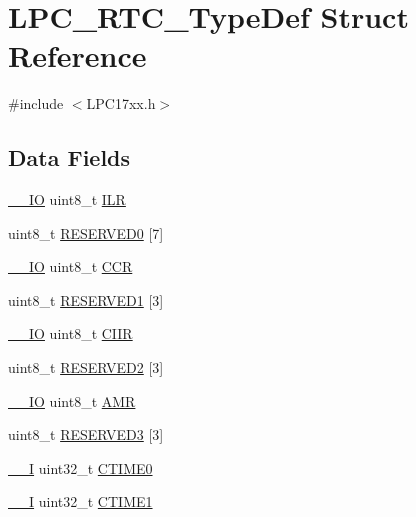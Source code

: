 \hypertarget{structLPC__RTC__TypeDef}{}\section{L\+P\+C\+\_\+\+R\+T\+C\+\_\+\+Type\+Def Struct Reference}
\label{structLPC__RTC__TypeDef}


{\ttfamily \#include $<$L\+P\+C17xx.\+h$>$}

\subsection*{Data Fields}
\begin{DoxyCompactItemize}
\item 
\hyperlink{LPC17xx_8h_aec43007d9998a0a0e01faede4133d6be}{\+\_\+\+\_\+\+IO} uint8\+\_\+t \hyperlink{structLPC__RTC__TypeDef_ad426477ee9b45960f84aa97e0bb3b2e3}{I\+LR}
\item 
uint8\+\_\+t \hyperlink{structLPC__RTC__TypeDef_a6f4c35345a87dea300753b60b26f9e86}{R\+E\+S\+E\+R\+V\+E\+D0} \mbox{[}7\mbox{]}
\item 
\hyperlink{LPC17xx_8h_aec43007d9998a0a0e01faede4133d6be}{\+\_\+\+\_\+\+IO} uint8\+\_\+t \hyperlink{structLPC__RTC__TypeDef_ac61a9f77ad3c8f9ed565acf2e95cb458}{C\+CR}
\item 
uint8\+\_\+t \hyperlink{structLPC__RTC__TypeDef_a18d805272469609c453d298ba86e1c20}{R\+E\+S\+E\+R\+V\+E\+D1} \mbox{[}3\mbox{]}
\item 
\hyperlink{LPC17xx_8h_aec43007d9998a0a0e01faede4133d6be}{\+\_\+\+\_\+\+IO} uint8\+\_\+t \hyperlink{structLPC__RTC__TypeDef_a3098ab5ae850961f2b5c1e4723c75797}{C\+I\+IR}
\item 
uint8\+\_\+t \hyperlink{structLPC__RTC__TypeDef_ac5569b1766672500d444fcfa87ea2808}{R\+E\+S\+E\+R\+V\+E\+D2} \mbox{[}3\mbox{]}
\item 
\hyperlink{LPC17xx_8h_aec43007d9998a0a0e01faede4133d6be}{\+\_\+\+\_\+\+IO} uint8\+\_\+t \hyperlink{structLPC__RTC__TypeDef_a18176ac70767e089bdf4e3d4bb31f336}{A\+MR}
\item 
uint8\+\_\+t \hyperlink{structLPC__RTC__TypeDef_aa35451280579ad796a894bb9f73772af}{R\+E\+S\+E\+R\+V\+E\+D3} \mbox{[}3\mbox{]}
\item 
\hyperlink{LPC17xx_8h_af63697ed9952cc71e1225efe205f6cd3}{\+\_\+\+\_\+I} uint32\+\_\+t \hyperlink{structLPC__RTC__TypeDef_a6adcca1e2ce945815422ebfaea001084}{C\+T\+I\+M\+E0}
\item 
\hyperlink{LPC17xx_8h_af63697ed9952cc71e1225efe205f6cd3}{\+\_\+\+\_\+I} uint32\+\_\+t \hyperlink{structLPC__RTC__TypeDef_ac7a8f880dfe43b9a0bc3662b295203c3}{C\+T\+I\+M\+E1}

\end{DoxyCompactItemize}
